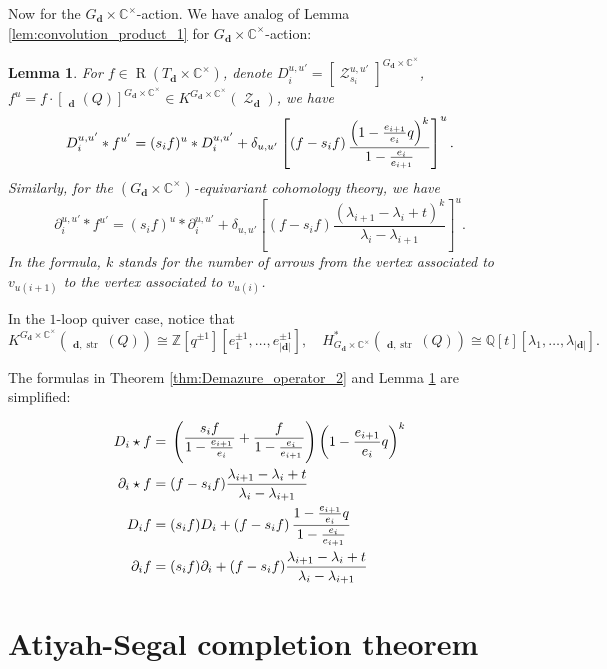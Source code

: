 \documentclass[reqno,11pt]{book}
\numberwithin{equation}{section}
\theoremstyle{plain}
\newtheorem{lemma}[theorem]{Lemma}
\theoremstyle{plain}
\numberwithin{equation}{section}
\theoremstyle{remark}
\DeclareMathOperator{\RRep}{\widetilde{\operatorname{Rep}}}
\DeclareMathOperator{\Rpt}{\operatorname{R}}
\DeclareMathOperator{\St}{\mathcal{Z}}
\DeclareMathOperator{\str}{\operatorname{str}}
\newcommand{\dimvec}[1]{\mathbf{#1}}
\newcommand{\abdimvec}[1]{|\dimvec{#1}|}
\newcommand{\fakestar}{*}
\begin{document}
Now for the $G_{\dimvec{d}} \times \mathbb{C}^{\times}$-action. We have analog of Lemma \ref{lem:convolution_product_1} for $G_{\dimvec{d}} \times \mathbb{C}^{\times}$-action:
\begin{lemma}\label{lem:convolution_product_2}
For $f \in \Rpt(T_{\dimvec{d}} \times \mathbb{C}^{\times})$, denote $D_i^{u,u'} =\left[\St_{s_{i}}^{u,u'}\right]^{G_{\dimvec{d}}\times \mathbb{C}^{\times}}$, $f^{u}=f \cdot \left[ \RRep_{\dimvec{d}}(Q) \right]^{G_{\dimvec{d}}\times \mathbb{C}^{\times}} \in K^{G_{\dimvec{d}}\times \mathbb{C}^{\times}} (\St_{\dimvec{d}})$, we have
$$D_i^{u,u'} \fakestar f^{u'}= (s_i f)^{u} \fakestar D_i^{u,u'} +  \delta_{u,u'}\left[\left(f-s_i f\right) \raisebox{-1mm}{$\displaystyle\frac{\left( 1-\frac{e_{i+1}}{e_{i}} q\right)^{k}}{ 1-\frac{e_{i}}{e_{i+1}}}$}\right]^{u}.$$
Similarly, for the $(G_{\dimvec{d}}\times \mathbb{C}^{\times})$-equivariant cohomology theory, we have
$$\partial_i^{u,u'} \fakestar f^{u'}= (s_i f)^{u} \fakestar \partial_i^{u,u'} +  \delta_{u,u'}\left[\left(f-s_i f\right) 
\frac{\left(\lambda_{i+1}-\lambda_{i}+t\right)^{k}}{\lambda_{i}-\lambda_{i+1}}   \right]^{u}.$$
In the formula, $k$ stands for the number of arrows from the vertex associated to $v_{u(i+1)}$ to the vertex associated to $v_{u(i)}$.
\end{lemma}
In the $1$-loop quiver case, notice that
$$K^{G_{\dimvec{d}} \times \mathbb{C}^{\times}} \left(\RRep_{\dimvec{d},\str}(Q)\right) \cong  \mathbb{Z}\left[q^{\pm 1}\right]\!\left[ e_1^{\pm 1},\ldots,e_{\abdimvec{d}}^{\pm 1} \right], \quad H_{G_{\dimvec{d}}\times \mathbb{C}^{\times}}^{*}\!\!\left(\RRep_{\dimvec{d},\str}(Q)\right) \cong  \mathbb{Q}[t]\left[\lambda_1,\ldots,\lambda_{\abdimvec{d}}\right].$$

The formulas in Theorem \ref{thm:Demazure_operator_2} and Lemma \ref{lem:convolution_product_2} are simplified:

\begin{equation*}
\begin{aligned}
  D_i \star f=\;&
  \left( \raisebox{1mm}{$\displaystyle\frac{s_i f}{ 1-\frac{e_{i+1}}{e_{i}}}     + \frac{f}{1-\frac{e_{i}}{e_{i+1}}}$}  \right)\left(\displaystyle 1-\frac{e_{i+1}}{e_{i}} q\right)^{k} \\
  \partial_i \star f =\;& (f -s_i f) \frac{\lambda_{i+1}-\lambda_{i}+t}{\lambda_{i}-\lambda_{i+1}}\\
  D_i f =\;& (s_i f) D_i + \left(f-s_i f\right) \displaystyle\frac{ 1-\frac{e_{i+1}}{e_{i}} q}{ 1-\frac{e_{i}}{e_{i+1}}}\\ 
  \partial_i f =\;& (s_i f) \partial_i + (f-s_i f) \frac{\lambda_{i+1}-\lambda_{i}+t}{\lambda_{i}-\lambda_{i+1}}\\   
\end{aligned}
\end{equation*}
\section{Atiyah-Segal completion theorem}\label{sec:AScompletion}




\end{document}
